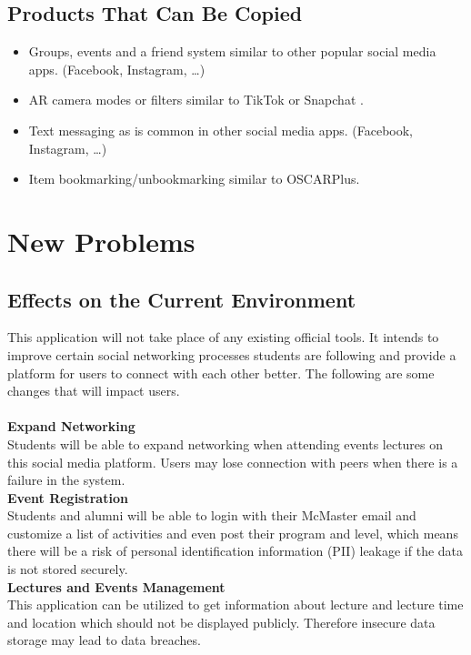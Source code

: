 \documentclass[12pt]{article}
\begin{document}
\subsection{Products That Can Be Copied}
\begin{itemize}
  \item Groups, events and a friend system similar to other popular social media apps. (Facebook, Instagram, \dots)
  \item AR camera modes or filters similar to TikTok \cite{effect house} or Snapchat \cite{lens}.
  \item Text messaging as is common in other social media apps. (Facebook, Instagram, \dots)
  \item Item bookmarking/unbookmarking similar to OSCARPlus.
\end{itemize}
\section{New Problems}
\subsection{Effects on the Current Environment}

This application will not take place of any existing official tools. It intends to improve certain social networking processes students are following and provide a platform for users to connect with each other better. The following are some changes that will impact users.\\
\noindent\\
\textbf{Expand Networking}\\
Students will be able to expand networking when attending events lectures on this social media platform. Users may lose connection with peers when there is a failure in the system. 
\noindent\\
\textbf{Event Registration}\\
Students and alumni will be able to login with their McMaster email and customize a list of activities and even post their program and level, which means there will be a risk of personal identification information (PII) leakage if the data is not stored securely.
\noindent\\
\textbf{Lectures and Events Management}\\
This application can be utilized to get information about lecture and lecture time and location which should not be displayed publicly. Therefore insecure data storage may lead to data breaches.
\end{document}
